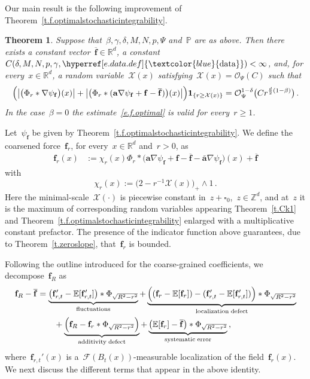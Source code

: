 \documentclass[11pt,twoside]{article} %
\let\oldsquare\square %
\renewcommand{\square}{\oldsquare}
\numberwithin{equation}{section}
\newtheorem{theorem}{Theorem}[section]
\theoremstyle{definition}
\newcommand{\dataref}{\hyperref[e.data.def]{\textcolor{blue}{\ensuremath{\mathrm{data}}}}}
\newcommand*{\Z}{\ensuremath{\mathbb{Z}}}
\newcommand*{\R}{\ensuremath{\mathbb{R}}}
\newcommand*{\Rd}{\ensuremath{\mathbb{R}^d}}
\newcommand{\f}{\mathbf{f}}
\renewcommand{\a}{\mathbf{a}}
\newcommand{\ahom}{\bar{\a}}
\newcommand{\cu}{\square}
\newcommand{\F}{\mathcal{F}}
\renewcommand{\P}{\mathbb{P}}
\newcommand{\E}{\mathbb{E}}
\newcommand{\X}{\mathcal{X}}
\renewcommand{\O}{\mathcal{O}}
\newcommand{\indc}{\boldsymbol{1}}
\newcommand{\minscale}{\chi}
\begin{document}
Our main result is the following improvement of Theorem~\ref{t.f.optimalstochasticintegrability}. 

\begin{theorem} \label{t.f.optimal}
Suppose that~$\beta,\gamma,\delta,M,N,p,\Psi$ and~$\P$ are as above. Then there exists a constant vector~$\overline{\f}\in \Rd$, a constant~$C(\delta,M,N,p,\gamma,\dataref)<\infty$, and, for every~$x \in \R^d$, a random variable~$\X(x)$ satisfying~$\X(x) = \O_{\Psi}(C)$ such that
\begin{equation} \label{e.f.optimal}
\Bigl(
\bigl| \bigl(\Phi_r \ast \nabla \psi_{\f} \bigr)(x) \bigr| + 
\bigl| \bigl( \Phi_r \ast (\a \nabla \psi_{\f} + \f - \overline{\f})\bigr) (x) \bigr| 
\Bigr)
\indc_{\{r \geq \X(x)\}}
= 
\O_\Psi^{1-\delta}\bigl(C r^{\frac d2(1-\beta)}\bigr) \,.
\end{equation}
In the case~$\beta=0$ the estimate~\eqref{e.f.optimal} is valid for every~$r\geq 1$. 
\end{theorem}





\smallskip






Let~$\psi_{\f}$ be given by Theorem~\ref{t.f.optimalstochasticintegrability}. We define the coarsened force~$\f_r$, for every~$x \in \R^d$ and~$r >0$, as  
\begin{align}  \label{e.fr}
\f_r(x) & :=  \chi_r(x) \Phi_r \ast  \bigl( \a \nabla \psi_{\f} + \f - \overline{\f}  - \ahom \nabla \psi_{\f} \bigr) (x) 
+  \overline{\f}
\end{align}
with
\begin{equation*}  
\minscale_r(x) := \bigl(2 - r^{-1} \X(x) \bigr)_+ \wedge 1
\,.
\end{equation*}
Here the minimal-scale~$\X(\cdot)$ is piecewise constant in~$z + \cu_0$,~$z \in \Z^d$, and at~$z$ it is the maximum of corresponding random variables appearing  Theorem~\ref{t.Ck1} and Theorem~\ref{t.f.optimalstochasticintegrability} enlarged with a multiplicative constant prefactor.  The presence of the indicator function above guarantees, due to Theorem~\ref{t.zeroslope}, that~$\f_r$ is bounded. 

\smallskip

Following the outline introduced for the coarse-grained coefficients, we decompose~$\f_R$ as
\begin{align} 
\label{e.fr.splitting}
\notag
\f_R - \overline{\f}
&
=
\underbrace{
\bigl( \f'_{r,t} - \E [ \f'_{r,t} ] \bigr) \ast \Phi_{\sqrt{R^2-r^2}}
}_{\mathrm{fluctuations}}
+
\underbrace{
\Bigl( (\f_r - \E [ \f_r ]) - (\f'_{r,t} - \E [ \f'_{r,t} ] )  \Bigr) \ast \Phi_{\sqrt{R^2-r^2}} 
}_{\mathrm{localization \; defect}}
\\   & \qquad
+
\underbrace{
\Bigl( \f_R - \f_r \ast \Phi_{\sqrt{R^2-r^2}} \Bigr) 
}_{\mathrm{additivity \; defect}}
+
\underbrace{
\bigl( \E [ \f_r ]- \overline{\f} \bigr) \ast \Phi_{\sqrt{R^2-r^2}}
}_{\mathrm{systematic \;  error}}
\,,
\end{align}
where~$\f_{r,t}'(x)$ is a~$\F(B_t(x))$-measurable localization of the field~$\f_r(x)$.  
We next discuss the different terms that appear in the above identity. 
\end{document}
